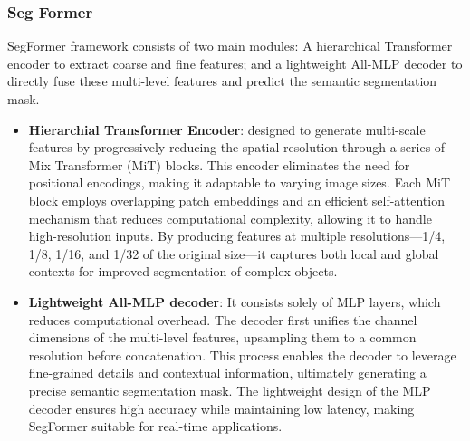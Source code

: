 \subsubsection{Seg Former}
SegFormer \cite{xie2021segformersimpleefficientdesign} framework consists of two main modules: A hierarchical Transformer
encoder to extract coarse and fine features; and a lightweight All-MLP decoder to directly fuse these multi-level features and predict the semantic segmentation mask.
\begin{itemize}
    \item \textbf{Hierarchial Transformer Encoder}: designed to generate multi-scale features by progressively reducing the spatial resolution through a series of Mix Transformer (MiT) blocks. This encoder eliminates the need for positional encodings, making it adaptable to varying image sizes. Each MiT block employs overlapping patch embeddings and an efficient self-attention mechanism that reduces computational complexity, allowing it to handle high-resolution inputs. By producing features at multiple resolutions—{1/4, 1/8, 1/16, and 1/32} of the original size—it captures both local and global contexts for improved segmentation of complex objects. 
    \item \textbf{Lightweight All-MLP decoder}: It consists solely of MLP layers, which reduces computational overhead. The decoder first unifies the channel dimensions of the multi-level features, upsampling them to a common resolution before concatenation. This process enables the decoder to leverage fine-grained details and contextual information, ultimately generating a precise semantic segmentation mask. The lightweight design of the MLP decoder ensures high accuracy while maintaining low latency, making SegFormer suitable for real-time applications.
\end{itemize}

